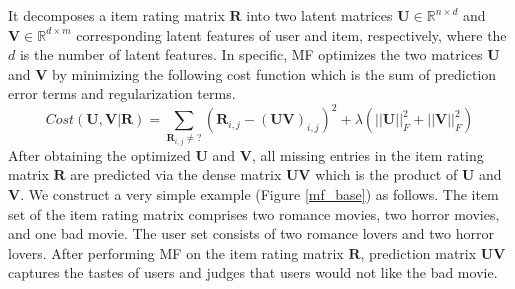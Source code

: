 \documentclass[master,english,final]{kaist-ucs}
\begin{document}
It decomposes a item rating matrix $\bm{R}$ into two latent matrices $\bm{U} \in \mathbb{R}^{n \times d}$ and $\bm{V} \in \mathbb{R}^{d \times m}$ corresponding latent features of user and item, respectively, where the $d$ is the number of latent features.
In specific, MF optimizes the two matrices $\bm{U}$ and $\bm{V}$ by minimizing the following cost function which is the sum of prediction error terms and regularization terms.
\begin{equation}
Cost(\bm{U},\bm{V} | \bm{R})=\sum_{\bm{R}_{i,j} \neq ?} (  \bm{R}_{i,j} - (\bm{UV})_{i,j} )^2 + \lambda(||\bm{U}||_F^2+||\bm{V}||_F^2)
\end{equation}
After obtaining the optimized $\bm{U}$ and $\bm{V}$, all missing entries in the item rating matrix $\bm{R}$ are predicted via the dense matrix $\bm{UV}$ which is the product of $\bm{U}$ and $\bm{V}$.
We construct a very simple example (Figure \ref{mf_base}) as follows.
The item set of the item rating matrix comprises two romance movies, two horror movies, and one bad movie.
The user set consists of two romance lovers and two horror lovers.
After performing MF on the item rating matrix $\bm{R}$, prediction matrix $\bm{UV}$ captures the tastes of users and judges that users would not like the bad movie.
\end{document}
